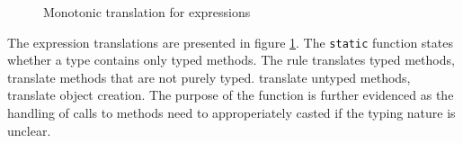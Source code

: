 \documentclass[a4paper,USenglish]{tex/lipics-v2016}
\begin{document}
\begin{figure}[!ht]
\begin{mathpar}




\end{mathpar}
\caption{Monotonic translation for expressions}
\label{fig:mono-trans2}
\end{figure}

The expression translations are presented in figure \ref{fig:mono-trans2}. 
The \texttt{static} function states whether a type contains only typed methods.
The rule  translates typed methods,  translate methods that are not purely typed.
 translate untyped methods,  translate object creation.
The purpose of the  function is further evidenced as the 
handling of calls to methods need to approperiately casted if the typing nature is unclear.
\end{document}
